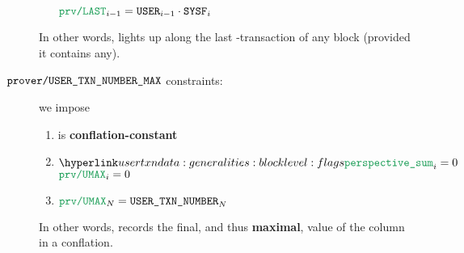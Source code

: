 \begin{description}
\begin{enumerate}
                                \Then $\proverColD _{i - 1}                   =    \user _{i - 1} \cdot \sysf _{i}$
                \end{enumerate}
                \saNote{}
                In other words,
                \proverColD{} lights up along the last \user{}-transaction of any block
                (provided it contains any).
        \item[$\texttt{prover\texttt{/}\texttt{USER}\texttt{\_}\texttt{TXN\_NUMBER}\_MAX} {}$ constraints:]
                we impose
                \begin{enumerate}
                        \item \proverColA{} is \textbf{conflation-constant}
                        \item \If $\perspectiveSum _{i} = 0$ \Then $\proverColA _{i} = 0$
                        \item $\proverColA _{N} = \userTransactionNumber _{N}$
                \end{enumerate}
                \saNote{}
                In other words,
                \proverColA{} records the final, and thus \textbf{maximal},
                value of the \userTransactionNumber{} column in a conflation.
\end{description}
